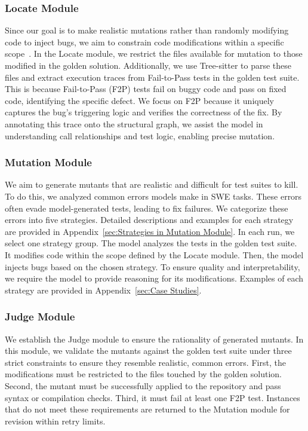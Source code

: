 \documentclass[11pt]{article}
\begin{document}
\subsubsection{Locate Module}
Since our goal is to make realistic mutations rather than randomly modifying code to inject bugs, we aim to constrain code modifications within a specific scope~\citep{yu-etal-2025-testagent}. In the Locate module, we restrict the files available for mutation to those modified in the golden solution. Additionally, we use Tree-sitter to parse these files and extract execution traces from Fail-to-Pass tests in the golden test suite. This is because Fail-to-Pass (F2P) tests fail on buggy code and pass on fixed code, identifying the specific defect. We focus on F2P because it uniquely captures the bug's triggering logic and verifies the correctness of the fix. By annotating this trace onto the structural graph, we assist the model in understanding call relationships and test logic, enabling precise mutation.


\subsubsection{Mutation Module}
We aim to generate mutants that are realistic and difficult for test suites to kill. To do this, we analyzed common errors models make in SWE tasks. These errors often evade model-generated tests, leading to fix failures. We categorize these errors into five strategies. Detailed descriptions and examples for each strategy are provided in Appendix~\ref{sec:Strategies in Mutation Module}. In each run, we select one strategy group. The model analyzes the tests in the golden test suite. It modifies code within the scope defined by the Locate module. Then, the model injects bugs based on the chosen strategy. To ensure quality and interpretability, we require the model to provide reasoning for its modifications. Examples of each strategy are provided in Appendix~\ref{sec:Case Studies}.

\subsubsection{Judge Module}
We establish the Judge module to ensure the rationality of generated mutants. In this module, we validate the mutants against the golden test suite under three strict constraints to ensure they resemble realistic, common errors. First, the modifications must be restricted to the files touched by the golden solution. Second, the mutant must be successfully applied to the repository and pass syntax or compilation checks. Third, it must fail at least one F2P test. Instances that do not meet these requirements are returned to the Mutation module for revision within retry limits.
\end{document}
